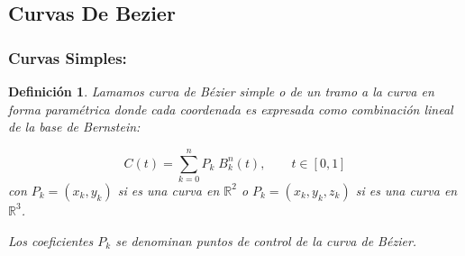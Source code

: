 \documentclass[ebook,oneside]{memoir}
\newtheorem{defn}[thm]{Definición}
\begin{document}
\subsection{Curvas De Bezier}

\subsubsection{Curvas Simples:}

\begin{defn}
Lamamos curva de B\'{e}zier simple o de un tramo a la curva en forma param\'{e}trica donde cada coordenada es expresada como combinaci\'{o}n lineal de la base de Bernstein:

$$C(t)=\sum_{k=0}^n P_k \; B_k^n(t), \quad \quad t\in [0,1]$$
con $P_k=(x_k,y_k)$ si es una curva en $\mathbb{R}^2$ o $P_k=(x_k,y_k,z_k)$ si es una curva en $\mathbb{R}^3$.

\vspace{0.3cm}

Los coeficientes $P_k$ se denominan puntos de control de la curva de B\'{e}zier.
\end{defn}
\end{document}
